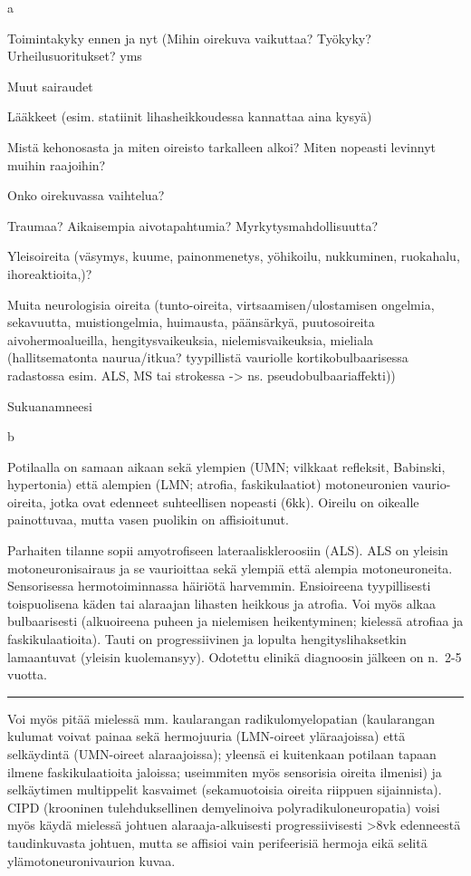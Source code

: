 \documentclass[
]{book}
\begin{document}
a

Toimintakyky ennen ja nyt (Mihin oirekuva vaikuttaa? Työkyky? Urheilusuoritukset? yms

Muut sairaudet

Lääkkeet (esim. statiinit lihasheikkoudessa kannattaa aina kysyä)

Mistä kehonosasta ja miten oireisto tarkalleen alkoi? Miten nopeasti levinnyt muihin raajoihin?

Onko oirekuvassa vaihtelua?

Traumaa? Aikaisempia aivotapahtumia? Myrkytysmahdollisuutta?

Yleisoireita (väsymys, kuume, painonmenetys, yöhikoilu, nukkuminen, ruokahalu, ihoreaktioita,)?

Muita neurologisia oireita (tunto-oireita, virtsaamisen/ulostamisen ongelmia, sekavuutta, muistiongelmia, huimausta, päänsärkyä, puutosoireita aivohermoalueilla, hengitysvaikeuksia, nielemisvaikeuksia, mieliala (hallitsematonta naurua/itkua? tyypillistä vauriolle kortikobulbaarisessa radastossa esim. ALS, MS tai strokessa -\textgreater{} ns. pseudobulbaariaffekti))

Sukuanamneesi

b

Potilaalla on samaan aikaan sekä ylempien (UMN; vilkkaat refleksit, Babinski, hypertonia) että alempien (LMN; atrofia, faskikulaatiot) motoneuronien vaurio-oireita, jotka ovat edenneet suhteellisen nopeasti (6kk). Oireilu on oikealle painottuvaa, mutta vasen puolikin on affisioitunut.

Parhaiten tilanne sopii amyotrofiseen lateraaliskleroosiin (ALS). ALS on yleisin motoneuronisairaus ja se vaurioittaa sekä ylempiä että alempia motoneuroneita. Sensorisessa hermotoiminnassa häiriötä harvemmin. Ensioireena tyypillisesti toispuolisena käden tai alaraajan lihasten heikkous ja atrofia. Voi myös alkaa bulbaarisesti (alkuoireena puheen ja nielemisen heikentyminen; kielessä atrofiaa ja faskikulaatioita). Tauti on progressiivinen ja lopulta hengityslihaksetkin lamaantuvat (yleisin kuolemansyy). Odotettu elinikä diagnoosin jälkeen on n.~2-5 vuotta.

\begin{center}\rule{0.5\linewidth}{0.5pt}\end{center}

Voi myös pitää mielessä mm. kaularangan radikulomyelopatian (kaularangan kulumat voivat painaa sekä hermojuuria (LMN-oireet yläraajoissa) että selkäydintä (UMN-oireet alaraajoissa); yleensä ei kuitenkaan potilaan tapaan ilmene faskikulaatioita jaloissa; useimmiten myös sensorisia oireita ilmenisi) ja selkäytimen multippelit kasvaimet (sekamuotoisia oireita riippuen sijainnista). CIPD (krooninen tulehduksellinen demyelinoiva polyradikuloneuropatia) voisi myös käydä mielessä johtuen alaraaja-alkuisesti progressiivisesti \textgreater8vk edenneestä taudinkuvasta johtuen, mutta se affisioi vain perifeerisiä hermoja eikä selitä ylämotoneuronivaurion kuvaa.
\end{document}
